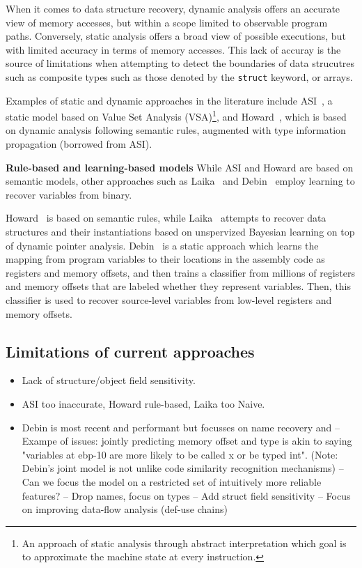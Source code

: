 \documentclass{article}
\begin{document}
When it comes to data structure recovery, dynamic analysis offers an accurate view of memory accesses, but within a scope limited to observable program paths. Conversely, static analysis offers a broad view of possible executions, but with limited accuracy in terms of memory accesses. This lack of accuray is the source of limitations when attempting to detect the boundaries of data strucutres such as composite types such as those denoted by the \texttt{struct} keyword, or arrays.

Examples of static and dynamic approaches in the literature include ASI~\cite{asi}, a static model based on Value Set Analysis (VSA)\footnote{An approach of static analysis through abstract interpretation which goal is to approximate the machine state at every instruction.}, and Howard~\cite{howard}, which is based on dynamic analysis following semantic rules, augmented with type information propagation (borrowed from ASI).

\textbf{Rule-based and learning-based models}
While ASI and Howard are based on semantic models, other approaches such as Laika~\cite{laika} and Debin~\cite{debin} employ learning to recover variables from binary.

Howard~\cite{howard} is based on semantic rules, while Laika~\cite{laika} attempts to recover data structures and their instantiations based on unspervized Bayesian learning on top of dynamic pointer analysis. Debin~\cite{debin} is a static approach which learns the mapping from program variables to their locations in the assembly code as registers and memory offsets, and then trains a classifier from millions of registers and memory offsets that are labeled whether they represent variables. Then, this classifier is used to recover source-level variables from low-level registers and memory offsets.

\subsection{Limitations of current approaches}
\begin{itemize}
	\item Lack of structure/object field sensitivity.
	\item ASI too inaccurate, Howard rule-based, Laika too Naive.
	\item Debin is most recent and performant but focusses on name recovery and
		-- Exampe of issues: jointly predicting memory offset and type is akin
		to saying "variables at ebp-10 are more likely to be called x or be
		typed int". (Note: Debin's joint model is not unlike code similarity recognition mechanisms) -- Can we focus the model on a restricted set of intuitively more reliable features? -- Drop names, focus on types -- Add struct field sensitivity -- Focus on improving data-flow analysis (def-use chains)
\end{itemize}
\end{document}
